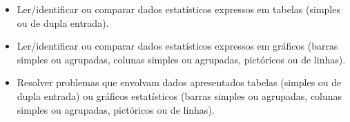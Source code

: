 
\begin{itemize}
\item Ler/identificar ou comparar dados estatísticos expressos em tabelas
(simples ou de dupla entrada).

\item Ler/identificar ou comparar dados estatísticos expressos em gráficos
(barras simples ou agrupadas, colunas simples ou agrupadas, pictóricos
ou de linhas).

\item Resolver problemas que envolvam dados apresentados tabelas (simples ou
de dupla entrada) ou gráficos estatísticos (barras simples ou agrupadas,
colunas simples ou agrupadas, pictóricos ou de linhas).
\end{itemize}


